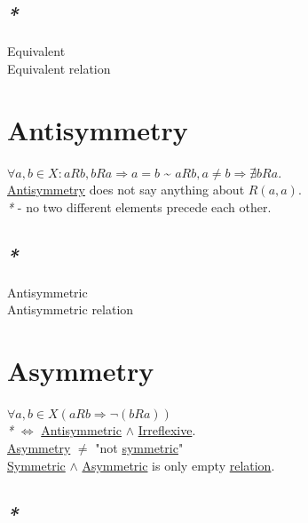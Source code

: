 \documentclass[a4paper,14pt,oneside]{book}
\begin{document}
{\subsection{\emph{*}}
\label{sec:orgd259b94}

\label{orgfc48fc8}Equivalent\\
\label{orga1645d7}Equivalent relation\\

\section{\label{orgc0e64ce}Antisymmetry}
\label{sec:org855a57f}

\(\forall a, b \in X : aRb, bRa \Rightarrow a = b\) \textasciitilde{} \(aRb, a \ne b \Rightarrow \nexists bRa\).\\
\hyperref[orgc0e64ce]{Antisymmetry} does not say anything about \(R(a,a)\).\\

\emph{*} - no two different elements precede each other.\\

\subsection{\emph{*}}
\label{sec:orgb1e7d8e}

\label{org632830b}Antisymmetric\\
\label{org7f79dac}Antisymmetric relation\\

\section{\label{org7731da2}Asymmetry}
\label{sec:orge7c4fcb}

\(\forall a,b \in X (aRb \Rightarrow \neg (bRa))\)\\
\emph{*} \(\iff\) \hyperref[org632830b]{Antisymmetric} \(\land\) \hyperref[orgf9f600e]{Irreflexive}.\\
\hyperref[org7731da2]{Asymmetry} \(\ne\) "not \hyperref[org809cc6c]{symmetric}"\\
\hyperref[org809cc6c]{Symmetric} \(\land\) \hyperref[org227b668]{Asymmetric} is only empty \hyperref[orgc61e9ed]{relation}.\\

\subsection{\emph{*}}
\label{sec:orga086eac}

}
\end{document}
